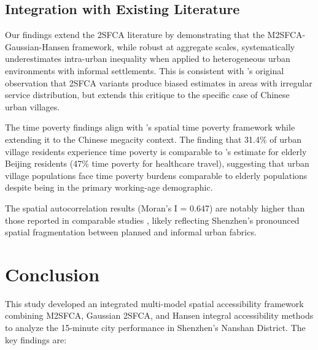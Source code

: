 \documentclass[preprint,12pt,authoryear]{elsarticle}
\begin{document}
\subsection{Integration with Existing Literature}
\label{sec:literature_integration}

Our findings extend the 2SFCA literature by demonstrating that the M2SFCA-Gaussian-Hansen framework, while robust at aggregate scales, systematically underestimates intra-urban inequality when applied to heterogeneous urban environments with informal settlements. This is consistent with \citet{dai2010spatial}'s original observation that 2SFCA variants produce biased estimates in areas with irregular service distribution, but extends this critique to the specific case of Chinese urban villages.

The time poverty findings align with \citet{pineda2020time}'s spatial time poverty framework while extending it to the Chinese megacity context. The finding that 31.4\% of urban village residents experience time poverty is comparable to \citet{li2022time}'s estimate for elderly Beijing residents (47\% time poverty for healthcare travel), suggesting that urban village populations face time poverty burdens comparable to elderly populations despite being in the primary working-age demographic.

The spatial autocorrelation results (Moran's I = 0.647) are notably higher than those reported in comparable studies \citep{vita2019spatial}, likely reflecting Shenzhen's pronounced spatial fragmentation between planned and informal urban fabrics.

\section{Conclusion}
\label{sec:conclusion}

This study developed an integrated multi-model spatial accessibility framework combining M2SFCA, Gaussian 2SFCA, and Hansen integral accessibility methods to analyze the 15-minute city performance in Shenzhen's Nanshan District. The key findings are:
\end{document}
